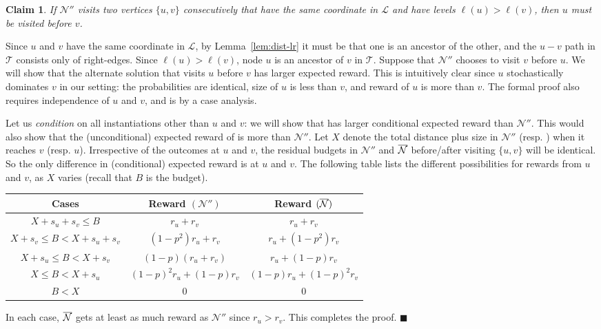 \documentclass[11pt,letterpaper]{article}
\newtheorem{claim}[theorem]{Claim}
\numberwithin{algorithm}{section}
\newenvironment{proof}{

\noindent{\bf Proof:}}
{\hfill$\blacksquare$


}
\newcommand{\lm}[0]{{\ensuremath{\mathcal{L}}}\xspace}
\newcommand{\N}[0]{{\ensuremath{\mathcal{N}}}\xspace}
\newcommand{\T}{\ensuremath{\mathcal{T}}\xspace}
\begin{document}
\begin{claim}\label{cl:line-na-ties}
If $\N''$ visits two vertices $\{u,v\}$ consecutively that have the same coordinate in \lm and have levels $\ell(u)>\ell(v)$, then $u$ must be visited before $v$.
\end{claim}
\begin{proof}
Since $u$ and $v$ have the same coordinate in \lm, by Lemma~\ref{lem:dist-lr} it must be that  one is an ancestor of the other, and the $u-v$ path in \T consists only of right-edges. Since $\ell(u)>\ell(v)$, node $u$ is an ancestor of $v$ in \T. Suppose that $\N''$ chooses to visit $v$ before $u$. We will show that the alternate solution \oN that visits $u$ before $v$ has larger expected reward. This is intuitively clear since $u$ stochastically dominates $v$ in our setting: the probabilities are identical, size of $u$ is less than $v$, and reward of $u$ is more than $v$. The formal proof also requires independence of $u$ and $v$, and is by a case analysis.

Let us {\em condition} on all instantiations other than $u$ and $v$: we will show that \oN has larger conditional expected reward than $\N''$. This would also show that the (unconditional) expected reward of \oN is more than $\N''$. Let $X$ denote the total distance plus size in $\N''$ (resp. \oN) when it reaches $v$ (resp. $u$). Irrespective of the outcomes at $u$ and $v$, the residual budgets in $\N''$ and $\overline{\cal N}$ before/after visiting $\{u,v\}$ will be identical. So the only difference in (conditional) expected reward is at $u$ and $v$. The following table lists the different possibilities for  rewards from $u$ and $v$, as $X$ varies (recall that $B$ is the budget).
\begin{center}
{\renewcommand{\arraystretch}{1.5}
\renewcommand{\tabcolsep}{0.2cm}\begin{tabular}{|c|c|c|}
\hline  Cases & Reward $(\N'')$ & Reward $(\overline{\cal N})$ \\
\hline $X+s_u+s_v\le B$ & $r_u+r_v$ & $r_u+r_v$ \\
\hline $X+s_v\le B<X+s_u+s_v$ & $(1-p^2)r_u+r_v$ & $r_u+(1-p^2)r_v$ \\
\hline $X+s_u\le B<X+s_v$ & $(1-p)(r_u+r_v)$ & $r_u+(1-p)r_v$ \\
\hline $X\le B <  X+s_u$ & $(1-p)^2r_u+(1-p)r_v$ & $(1-p)r_u+(1-p)^2r_v$ \\
\hline $B<X$ & $0$ & $0$ \\
\hline
\end{tabular}}
\end{center}
In each case, $\overline{\cal N}$ gets at least as much reward as $\N''$ since $r_u>r_v$. This completes the proof.
\end{proof}
\end{document}

